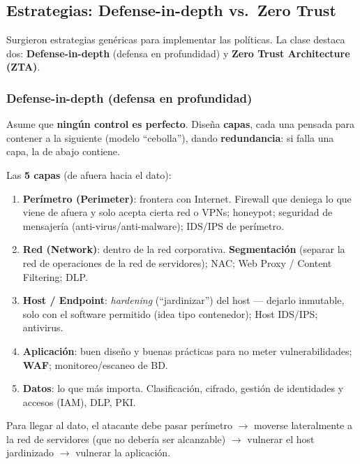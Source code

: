 \documentclass[../main.tex]{subfiles}
\begin{document}
\subsection{Estrategias: Defense-in-depth vs.\ Zero Trust}

Surgieron estrategias genéricas para implementar las políticas. La clase destaca
dos: \textbf{Defense-in-depth} (defensa en profundidad) y \textbf{Zero Trust
Architecture (ZTA)}.

\subsubsection{Defense-in-depth (defensa en profundidad)}
Asume que \textbf{ningún control es perfecto}. Diseña \textbf{capas}, cada una
pensada para contener a la siguiente (modelo ``cebolla''), dando
\textbf{redundancia}: si falla una capa, la de abajo contiene.

Las \textbf{5 capas} (de afuera hacia el dato):
\begin{enumerate}
  \item \textbf{Perímetro (Perimeter)}: frontera con Internet. Firewall que
    deniega lo que viene de afuera y solo acepta cierta red o VPNs; honeypot;
    seguridad de mensajería (anti-virus/anti-malware); IDS/IPS de perímetro.
  \item \textbf{Red (Network)}: dentro de la red corporativa.
    \textbf{Segmentación} (separar la red de operaciones de la red de
    servidores); NAC; Web Proxy / Content Filtering; DLP.
  \item \textbf{Host / Endpoint}: \emph{hardening} (``jardinizar'') del host
    --- dejarlo inmutable, solo con el software permitido (idea tipo
    contenedor); Host IDS/IPS; antivirus.
  \item \textbf{Aplicación}: buen diseño y buenas prácticas para no meter
    vulnerabilidades; \textbf{WAF}; monitoreo/escaneo de BD.
  \item \textbf{Datos}: lo que más importa. Clasificación, cifrado, gestión de
    identidades y accesos (IAM), DLP, PKI.
\end{enumerate}

Para llegar al dato, el atacante debe pasar perímetro $\to$ moverse
lateralmente a la red de servidores (que no debería ser alcanzable) $\to$
vulnerar el host jardinizado $\to$ vulnerar la aplicación.
\end{document}
